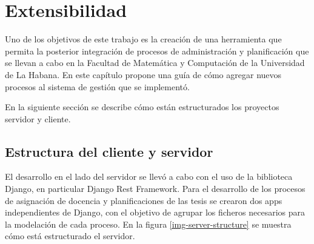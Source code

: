 \chapter{Extensibilidad}\label{chapter:extensibility}
Uno de los objetivos de este trabajo es la creación de una herramienta que 
permita la posterior integración de procesos de administración y planificación 
que se llevan a cabo en la Facultad de Matemática y Computación de la Universidad
de La Habana. 
En este capítulo propone una guía de cómo agregar nuevos 
procesos al sistema de gestión que se implementó.

En la siguiente sección se describe cómo están estructurados los proyectos 
servidor y cliente. 

\section{Estructura del cliente y servidor}
El desarrollo en el lado del servidor se llevó a cabo con el  
uso de la biblioteca Django, en particular Django Rest Framework.
Para el desarrollo de los procesos de asignación de docencia y planificaciones de las 
tesis se crearon dos apps independientes de Django, con el objetivo de agrupar los ficheros 
necesarios para la modelación de cada proceso. 
En la figura \ref{img-server-structure} se muestra cómo está estructurado el servidor.










